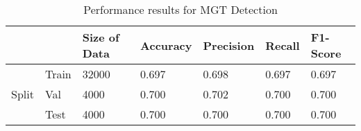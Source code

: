         \begin{table}[htbp]
            \centering
            \caption{Performance results for MGT Detection}
            \label{tab:mgt_detection}
            \begin{tabular}{lllllll}
            \toprule
             &  & Size of Data & Accuracy & Precision & Recall & F1-Score \\
            \midrule
            \multirow[c]{3}{*}{Split} & Train & 32000 & 0.697 & 0.698 & 0.697 & 0.697 \\
             & Val & 4000 & 0.700 & 0.702 & 0.700 & 0.700 \\
             & Test & 4000 & 0.700 & 0.700 & 0.700 & 0.700 \\
            \cline{1-2}
            \bottomrule
            \end{tabular}
            \end{table}